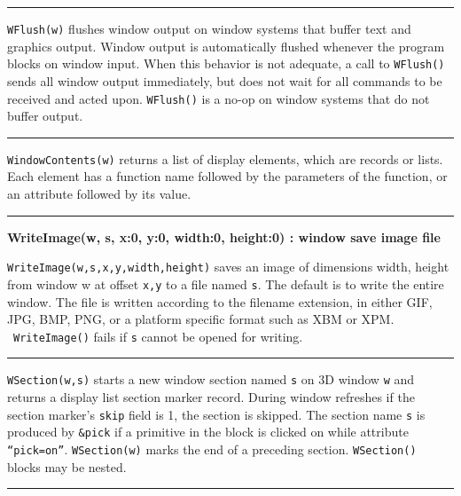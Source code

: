 \bigskip\hrule\vspace{0.1cm}

\noindent
\texttt{WFlush(w)} flushes window output on window systems that buffer
text and graphics output. Window output is automatically flushed
whenever the program blocks on window input. When this behavior is
not adequate, a call to \texttt{WFlush()} sends all window output
immediately, but does not wait for all commands to be received and
acted upon. \texttt{WFlush()} is a no-op on window systems that do not
buffer output.

\bigskip\hrule\vspace{0.1cm}

\noindent
\texttt{WindowContents(w)} returns a list of display elements, which are
records or lists. Each element has a function name followed by the
parameters of the function, or an attribute followed by its value.

\bigskip\hrule\vspace{0.1cm}
\noindent
{\bf WriteImage(w, s, x:0, y:0, width:0, height:0) : window
\hfill save image file}

\noindent
\texttt{WriteImage(w,s,x,y,width,height)} saves an image of dimensions
width, height from window w at offset \texttt{x,y} to a file named
\texttt{s}. The default is to write the entire window. The file
is written according to the filename extension, in either GIF, JPG,
BMP, PNG, or a platform specific format such as XBM or XPM.
\ \texttt{WriteImage()} fails if \texttt{s} cannot be opened for
writing.

\bigskip\hrule\vspace{0.1cm}

\noindent
\texttt{WSection(w,s)} starts a new window section named \texttt{s} on
3D window \texttt{w} and returns a display list section marker record.
During window refreshes if the section marker's
\texttt{skip} field is 1, the section is skipped. The section name
\texttt{s} is produced by \texttt{\&pick} if a primitive in the block
is clicked on while attribute
\texttt{{\textquotedblleft}pick=on{\textquotedblright}}.
\texttt{WSection(w)} marks the end of a preceding section.
\texttt{WSection()} blocks may be nested.

\bigskip\hrule\vspace{0.1cm}

